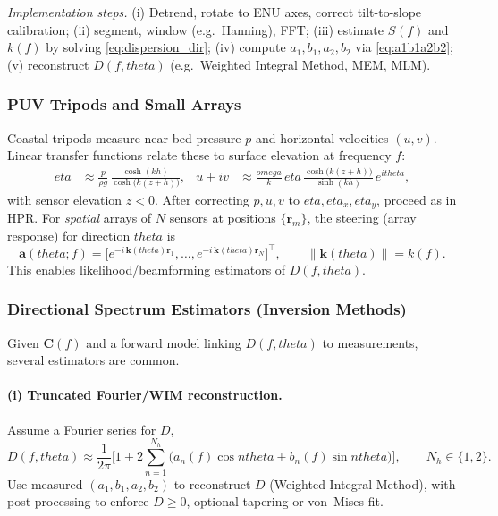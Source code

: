 \documentclass[journal,10pt,twocolumn]{IEEEtran}
\def\omega{omega}%
\def\eta{eta}%
\def\theta{theta}%
\def\mathrm#1{#1}%
\def\cdot{}%
\begin{document}
    \emph{Implementation steps.} (i) Detrend, rotate to ENU axes, correct tilt-to-slope calibration; (ii) segment, window (e.g.\ Hanning), FFT; (iii) estimate $S_{\cdot\cdot}(f)$ and $k(f)$ by solving \eqref{eq:dispersion_dir}; (iv) compute $a_1,b_1,a_2,b_2$ via \eqref{eq:a1b1a2b2}; (v) reconstruct $D(f,\theta)$ (e.g.\ Weighted Integral Method, MEM, MLM).

    \subsubsection{PUV Tripods and Small Arrays}
    Coastal tripods measure near-bed pressure $p$ and horizontal velocities $(u,v)$. Linear transfer functions relate these to surface elevation at frequency $f$:
    \begin{align}
        \eta &\approx \frac{p}{\rho g}\,\frac{\cosh(kh)}{\cosh\big(k(z+h)\big)},
        &
        u + \mathrm{i}v &\approx \frac{\omega}{k}\,\eta\,\frac{\cosh\big(k(z+h)\big)}{\sinh(kh)}\,e^{\mathrm{i}\theta},
    \end{align}
    with sensor elevation $z<0$. After correcting $p,u,v$ to $\eta,\eta_x,\eta_y$, proceed as in HPR. For \emph{spatial} arrays of $N$ sensors at positions $\{\mathbf{r}_m\}$, the steering (array response) for direction $\theta$ is
    \begin{equation}
        \mathbf{a}(\theta;f) =
        \big[e^{-\mathrm{i}\,\mathbf{k}(\theta)\cdot\mathbf{r}_1},\ldots,
        e^{-\mathrm{i}\,\mathbf{k}(\theta)\cdot\mathbf{r}_N}\big]^\top,
        \qquad \|\mathbf{k}(\theta)\|=k(f).
    \end{equation}
    This enables likelihood/beamforming estimators of $D(f,\theta)$.

    \subsubsection{Directional Spectrum Estimators (Inversion Methods)}
    Given $\mathbf{C}(f)$ and a forward model linking $D(f,\theta)$ to measurements, several estimators are common.

    \paragraph{(i) Truncated Fourier/WIM reconstruction.}
    Assume a Fourier series for $D$,
    \begin{equation}
        D(f,\theta) \approx \frac{1}{2\pi}\Bigg[
        1 + 2\sum_{n=1}^{N_h}\Big( a_n(f)\cos n\theta + b_n(f)\sin n\theta\Big)
        \Bigg],
        \qquad N_h \in \{1,2\}.
    \end{equation}
    Use measured $(a_1,b_1,a_2,b_2)$ to reconstruct $D$ (Weighted Integral Method), with post-processing to enforce $D\ge0$, optional tapering or von~Mises fit.
\end{document}
